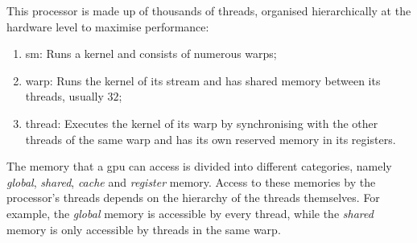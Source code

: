 \noindent This processor is made up of thousands of threads, organised hierarchically at the hardware level to maximise performance:
\begin{enumerate}[label=\roman*.]
\item \gls{sm}: Runs a kernel and consists of numerous \gls{warp}s;
\item \gls{warp}: Runs the kernel of its stream and has shared memory between its threads, usually $32$;
\item \gls{thread}: Executes the kernel of its warp by synchronising with the other \gls{thread}s of the same \gls{warp} and has its own reserved memory in its registers.
\end{enumerate}
\noindent The memory that a \gls{gpu} can access is divided into different categories, namely \textit{global}, \textit{shared}, \textit{cache} and \textit{register} memory. Access to these memories by the processor's \gls{thread}s depends on the hierarchy of the \gls{thread}s themselves. For example, the \textit{global} memory is accessible by every \gls{thread}, while the \textit{shared} memory is only accessible by \gls{thread}s in the same \gls{warp}.

